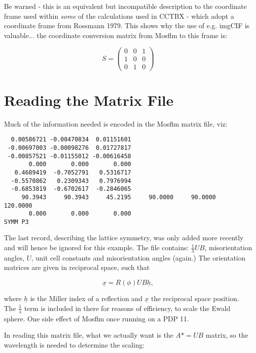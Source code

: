 \documentclass[a4paper, 11pt]{article}
\begin{document}
Be warned - this is an equivalent but incompatible description to the coordinate frame used within \emph{some} of the calculations used in CCTBX - which adopt a coordinate frame from Rossmann 1979. This shows why the use of e.g. imgCIF is valuable... the coordinate conversion matrix from Mosflm to this frame is:

\begin{equation}
S = \left( \begin{array}{ccc}
0 & 0 & 1 \\ 1 & 0 & 0 \\ 0 & 1 & 0 \end{array} \right)
\end{equation}

\section{Reading the Matrix File}

Much of the information needed is encoded in the Mosflm matrix file, viz:

{\small
\begin{verbatim}
  0.00586721 -0.00470834  0.01151601
 -0.00697003 -0.00098276  0.01727817
 -0.00857521 -0.01155012 -0.00616458
       0.000       0.000       0.000
   0.4689419  -0.7052791   0.5316717
  -0.5570862   0.2309343   0.7976994
  -0.6853819  -0.6702617  -0.2846065
     90.3943     90.3943     45.2195     90.0000     90.0000    120.0000
       0.000       0.000       0.000
SYMM P3       
\end{verbatim}
}

The last record, describing the lattice symmetry, was only added more recently and will hence be ignored for this example. The file contains: $\frac{1}{\lambda} U B$, misorientation angles, $U$, unit cell constants and misorientation angles (again.) The orientation matrices are given in reciprocal space, such that 

\begin{equation}
\underline{x} = R(\phi) U B \underline{h},
\end{equation}

\noindent
where $\underline{h}$ is the Miller index of a reflection and $\underline{x}$ the reciprocal space position. The $\frac{1}{\lambda}$ term is included in there for reasons of efficiency, to scale the Ewald sphere. One side effect of Mosflm once running on a PDP 11.

In reading this matrix file, what we actually want is the $A* = U B$ matrix, so the wavelength is needed to determine the scaling:
\end{document}
